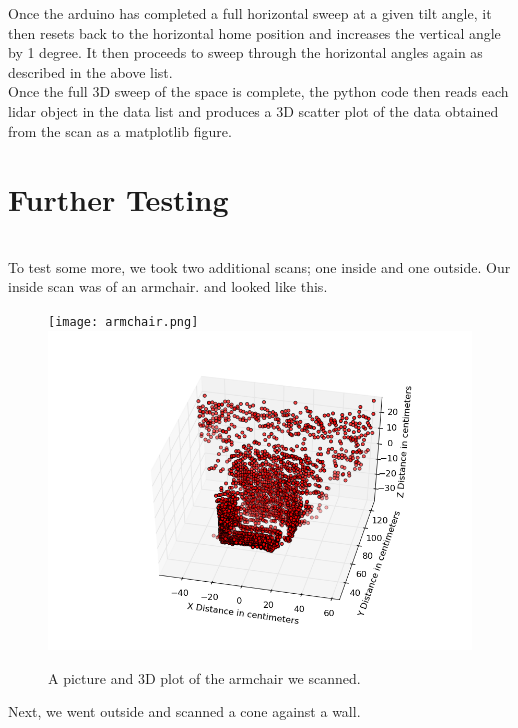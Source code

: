 \documentclass{article}
\begin{document}
Once the arduino has completed a full horizontal sweep at a given tilt angle, it then resets back to the horizontal home position and increases the vertical angle by 1 degree. It then proceeds to sweep through the horizontal angles again as described in the above list. \\

Once the full 3D sweep of the space is complete, the python code then reads each lidar object in the data list and produces a 3D scatter plot of the data obtained from the scan as a matplotlib figure.

\section{Further Testing}\ \\
To test some more, we took two additional scans; one inside and one outside. Our inside scan was of an armchair. and looked like this. 

\begin{figure}[h!]
\begin{center}
\texttt{[image: armchair.png]}
\includegraphics[scale=0.7]{armchair_scan2.png}
\caption{A picture and 3D plot of the armchair we scanned.}
\end{center}
\end{figure}

Next, we went outside and scanned a cone against a wall. 
\end{document}
